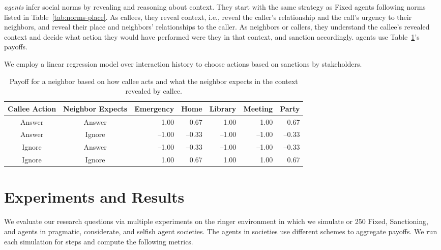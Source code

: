 \emph{\frameworkB agents} infer social norms by revealing and reasoning
about context. They start with the same strategy as Fixed
agents following norms listed in Table~\ref{tab:norms-place}. As
callees, they reveal context, i.e., reveal the caller's relationship and
the call's urgency to their neighbors, and reveal their place and 
neighbors' relationships to the caller. As neighbors or callers, they
understand the callee's revealed context and decide what action they would
have performed were they in that context, and sanction
accordingly. \frameworkB agents use Table~\ref{tab:payoff-neighbor-reason}'s payoffs.

We employ a linear regression model over interaction history to
choose actions based on sanctions by stakeholders.


\begin{table}[!tb]
\centering

\caption[Payoffs based on reasoning about the shared context]{Payoff for a neighbor based on how callee acts and what the neighbor expects in the context revealed by callee.}

\begin{tabular}{@{}c @{~~} c@{~~} r@{~~} r@{~~} r@{~~} r@{~~} r@{}}
\toprule

Callee Action&Neighbor Expects
 & Emergency & Home & Library & Meeting & Party\\\midrule

Answer&Answer & 1.00 & 0.67 & 1.00 & 1.00 & 0.67 \\
Answer&Ignore & --1.00 & --0.33 & --1.00 & --1.00 & --0.33 \\
Ignore&Answer & --1.00 & --0.33 & --1.00 & --1.00 & --0.33 \\
Ignore&Ignore & 1.00 & 0.67 & 1.00 & 1.00 & 0.67\\\bottomrule

\end{tabular}

\label{tab:payoff-neighbor-reason}

\end{table}

\section{Experiments and Results}
\label{sec:Poros-experiments}

We evaluate our research questions via multiple experiments 
on the ringer environment in which we
simulate  or 250 Fixed, Sanctioning, and \frameworkB agents in pragmatic, considerate, and selfish agent societies. The agents in societies use different schemes to aggregate payoffs. We run each
simulation for  steps and compute the following metrics.

